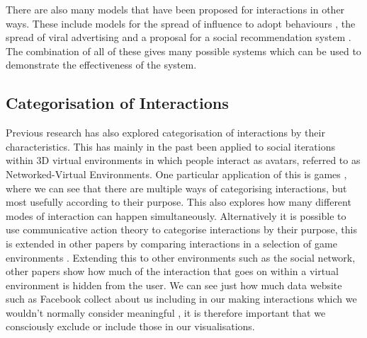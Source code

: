 \documentclass[12pt,a4paper]{article}
\begin{document}
There are also many models that have been proposed for interactions in other ways. These include models for the spread of influence to adopt behaviours \cite{kempe2003maximizing}, the spread of viral advertising \cite{van2010viral} and a proposal for a social recommendation system \cite{walter2008model}. The combination of all of these gives many possible systems which can be used to demonstrate the effectiveness of the system.

\subsection{Categorisation of Interactions}
\noindent
Previous research has also explored categorisation of interactions by their characteristics. This has mainly in the past been applied to social iterations within 3D virtual environments in which people interact as avatars, referred to as Networked-Virtual Environments. One particular application of this is games \cite{manninen2000interaction}, where we can see that there are multiple ways of categorising interactions, but most usefully according to their purpose. This also explores how many different modes of interaction can happen simultaneously. Alternatively it is possible to use communicative action theory to categorise interactions by their purpose, this is extended in other papers by comparing interactions in a selection of game environments \cite{becker2002social}. Extending this to other environments such as the social network, other papers show how much of the interaction that goes on within a virtual environment is hidden from the user. We can see just how much data website such as Facebook collect about us including in our making interactions which we wouldn't normally consider meaningful \cite{schneier2010taxonomy}, it is therefore important that we consciously exclude or include those in our visualisations.

\end{document}
